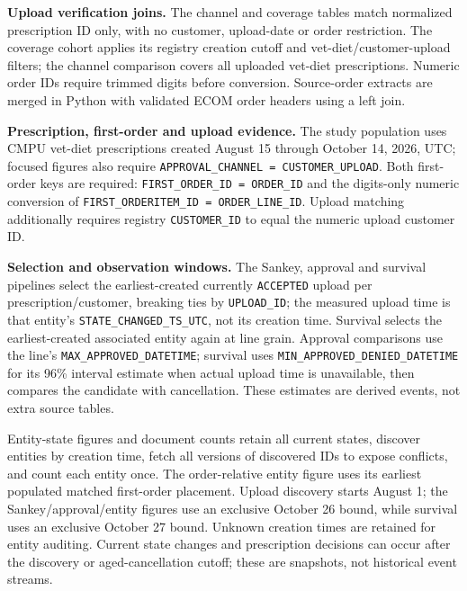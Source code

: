 \clearpage
\noindent\textbf{Upload verification joins.}
The channel and coverage tables match normalized prescription ID only, with no
customer, upload-date or order restriction. The coverage cohort applies its
registry creation cutoff and vet-diet/customer-upload filters; the channel
comparison covers all uploaded vet-diet prescriptions. Numeric order IDs require
trimmed digits before conversion. Source-order extracts are merged in Python
with validated ECOM order headers using a left join.


\clearpage
\noindent\textbf{Prescription, first-order and upload evidence.}
The study population uses CMPU vet-diet prescriptions created August 15 through
October 14, 2026, UTC; focused figures also require
\texttt{APPROVAL\_CHANNEL = CUSTOMER\_UPLOAD}. Both first-order keys are required:
\texttt{FIRST\_ORDER\_ID = ORDER\_ID} and the digits-only numeric conversion of
\texttt{FIRST\_ORDERITEM\_ID = ORDER\_LINE\_ID}. Upload matching additionally
requires registry \texttt{CUSTOMER\_ID} to equal the numeric upload customer ID.


\clearpage
\noindent\textbf{Selection and observation windows.}
The Sankey, approval and survival pipelines select the earliest-created currently
\texttt{ACCEPTED} upload per prescription/customer, breaking ties by
\texttt{UPLOAD\_ID}; the measured upload time is that entity's
\texttt{STATE\_CHANGED\_TS\_UTC}, not its creation time. Survival selects the
earliest-created associated entity again at line grain. Approval comparisons use
the line's \texttt{MAX\_APPROVED\_DATETIME}; survival uses
\texttt{MIN\_APPROVED\_DENIED\_DATETIME} for its 96\% interval estimate when actual
upload time is unavailable, then compares the candidate with cancellation.
These estimates are derived events, not extra source tables.

Entity-state figures and document counts retain all current states, discover
entities by creation time, fetch all versions of discovered IDs to expose
conflicts, and count each entity once. The order-relative entity figure uses
its earliest populated matched first-order placement. Upload discovery starts
August 1; the Sankey/approval/entity figures use an exclusive October 26 bound,
while survival uses an exclusive October 27 bound. Unknown creation times are
retained for entity auditing. Current state changes and prescription decisions
can occur after the discovery or aged-cancellation cutoff; these are snapshots,
not historical event streams.


